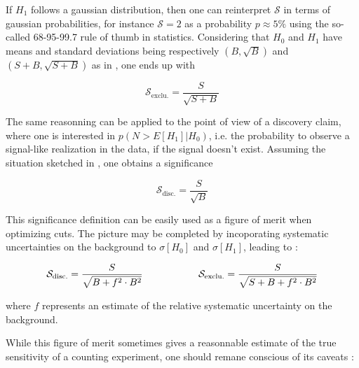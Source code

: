     If $H_1$ follows a gaussian distribution, then one can reinterpret $\mathcal{S}$ in terms
    of gaussian probabilities, for instance $\mathcal{S} = 2$ as a probability $p\approx5\%$
    using the so-called 68-95-99.7 rule of thumb in statistics. Considering that $H_0$ and
    $H_1$ have means and standard deviations being respectively $(B,\sqrt{B})$ and
    $(S+B,\sqrt{S+B})$ as in , one ends up with

    $$ \mathcal{S}_\text{exclu.} = \frac{S}{\sqrt{S+B}}$$

    The same reasonning can be applied to the point of view of a discovery claim, where
    one is interested in $p(N > E[H_1]|H_0)$, i.e. the probability to observe a
    signal-like realization in the data, if the signal doesn't exist. Assuming the situation
    sketched in , one obtains a significance

    $$ \mathcal{S}_\text{disc.} = \frac{S}{\sqrt{B}}$$

    This significance definition can be easily used as a figure of merit when optimizing
    cuts. The picture may be completed by incoporating systematic uncertainties on the
    background to $\sigma[H_0]$ and $\sigma[H_1]$, leading to :

    \begin{equation}
       \mathcal{S}_\text{disc.} = \frac{S}{\sqrt{B+f^2 \cdot B^2}}
       \hspace*{2cm}
       \mathcal{S}_\text{exclu.} = \frac{S}{\sqrt{S+B+f^2 \cdot B^2}}
       \label{FoM}
   \end{equation}

    where $f$ represents an estimate of the relative systematic uncertainty on the background.

    While this figure of merit sometimes gives a reasonnable estimate of the true
    sensitivity of a counting experiment, one should remane conscious of its caveats
    \cite{Punzi} :

